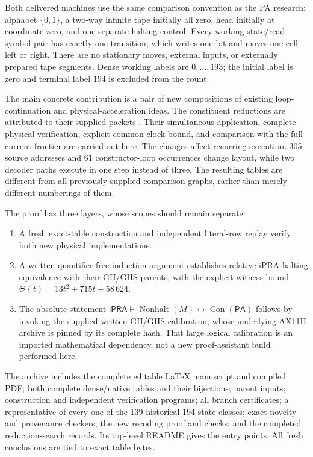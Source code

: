 \documentclass[11pt,letterpaper]{article}
\newcommand{\ipra}{\ensuremath{\mathsf{iPRA}}}
\newcommand{\PA}{\mathsf{PA}}
\newcommand{\Con}{\operatorname{Con}}
\newcommand{\NH}{\operatorname{Nonhalt}}
\begin{document}
Both delivered machines use the same comparison convention as the PA
research: alphabet $\{0,1\}$, a two-way infinite tape initially all zero,
head initially at coordinate zero, and one separate halting control.
Every working-state/read-symbol pair has exactly one transition, which
writes one bit and moves one cell left or right. There are no stationary
moves, external inputs, or externally prepared tape segments. Dense
working labels are $0,\ldots,193$; the initial label is zero and terminal
label 194 is excluded from the count.

The main concrete contribution is a pair of new compositions of existing
loop-continuation and physical-acceleration ideas. The constituent
reductions are attributed to their supplied packets \cite{gh,lc}. Their simultaneous
application, complete physical verification, explicit common clock bound,
and comparison with the full current frontier are carried out here.
The changes affect recurring execution: 305 source addresses and 61
constructor-loop occurrences change layout, while two decoder paths
execute in one step instead of three. The resulting tables are different
from all previously supplied comparison graphs, rather than merely
different numberings of them.

The proof has three layers, whose scopes should remain separate:
\begin{enumerate}
\item A fresh exact-table construction and independent literal-row replay
      verify both new physical implementations.
\item A written quantifier-free induction argument establishes relative
      iPRA halting equivalence with their GH/GHS parents, with the explicit
      witness bound $\Theta(t)=13t^2+715t+58\,624$.
\item The absolute statement
      $\ipra\vdash\NH(M)\leftrightarrow\Con(\PA)$ follows by invoking
      the supplied written GH/GHS calibration, whose underlying AX11H
      archive is pinned by its complete hash. That large logical
      calibration is an imported mathematical dependency, not a new
      proof-assistant build performed here.
\end{enumerate}

The archive includes the complete editable \LaTeX{} manuscript and compiled
PDF; both complete dense/native tables and their bijections; parent inputs;
construction and independent verification programs; all branch certificates;
a representative of every one of the 139 historical 194-state classes;
exact novelty and provenance checkers; the new recoding proof and checks;
and the completed reduction-search records. Its top-level README gives
the entry points. All fresh conclusions are tied to exact table bytes.
\end{document}
